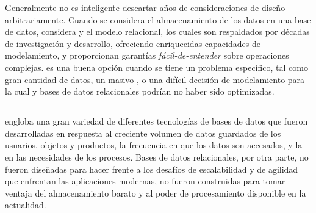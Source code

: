 Generalmente no es inteligente descartar años de consideraciones de diseño arbitrariamente. Cuando se considera el almacenamiento de los datos en una base de datos, considera \sql y el modelo relacional, los cuales son respaldados por décadas  de investigación y desarrollo, ofreciendo enriquecidas capacidades de modelamiento, y proporcionan garantías \textit{fácil-de-entender} sobre operaciones complejas. \nosql es una buena opción cuando se tiene un problema específico, tal como gran cantidad de datos, un masivo \workload, o una difícil decisión de modelamiento para la cual \sql y bases de datos relacionales podrían no haber sido optimizadas.

\subsection{\nosql}

\nosql engloba una gran variedad de diferentes tecnologías de bases de datos que fueron desarrolladas en respuesta al creciente volumen de datos guardados de los usuarios, objetos y productos, la frecuencia en que los datos son accesados, y la \performanceQA en las necesidades de los procesos. Bases de datos relacionales, por otra parte, no fueron diseñadas para hacer frente a los desafíos de escalabilidad y de agilidad que enfrentan las aplicaciones modernas, no fueron construidas para tomar ventaja del almacenamiento barato y al poder de procesamiento disponible en la actualidad.

\subsubsection{\documentModel}\label{cap:justificacion_proyecto:base_datos:nosql:document_model}

